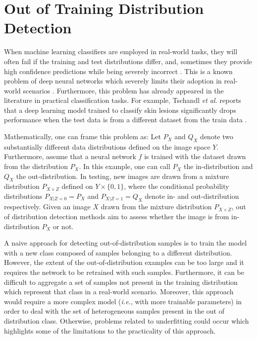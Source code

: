     
\section{Out of Training Distribution Detection}
\label{section:out_of_distribution}
    When machine learning classifiers are employed in real-world tasks, they will often fail if the training and test distributions differ, and, sometimes they provide high confidence predictions while being severely incorrect \cite{Goodfellow2015}\cite{Amodei2016}. This is a known problem of deep neural networks which severely limits their adoption in real-world scenarios \cite{Hendrycks2019}. Furthermore, this problem has already appeared in the literature in practical classification tasks. For example, Tschandl \textit{et al.} reports that a deep learning model trained to classify skin lesions significantly drops performance when the test data is from a different dataset from the train data \cite{humanvsisic2018}. 
    
    Mathematically, one can frame this problem as: Let $P_X$ and $Q_X$ denote two substantially different data distributions defined on the image space $Y$. Furthermore, assume that a neural network $f$ is trained with the dataset drawn from the distribution $P_X$. In this example, one can call $P_X$ the in-distribution and $Q_X$ the out-distribution. In testing, new images are drawn from a mixture distribution $P_{X \times Z}$ defined on $Y \times \{0, 1\}$, where the conditional probability distributions $P_{X|Z=0}=P_X$ and $P_{X|Z=1}=Q_X$ denote in- and out-distribution respectively. Given an image $X$ drawn from the mixture distribution $P_{X \times Z}$, out of distribution detection methods aim to assess whether the image is from in-distribution $P_X$ or not. \par
    
    A naive approach for detecting out-of-distribution samples is to train the model with a new class composed of samples belonging to a different distribution. However, the extent of the out-of-distribution examples can be too large and it requires the network to be retrained with such samples. Furthermore, it can be difficult to aggregate a set of samples not present in the training distribution which represent that class in a real-world scenario.  Moreover, this approach would require a more complex model (\textit{i.e.}, with more trainable parameters) in order to deal with the set of heterogeneous samples present in the out of distribution class. Otherwise, problems related to underfitting could occur which highlights some of the limitations to the practicality of this approach. \par

